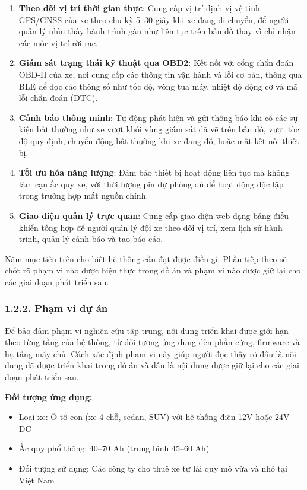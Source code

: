 \documentclass[a4paper]{extarticle}
\providecommand{\tightlist}{%
  \setlength{\itemsep}{0pt}\setlength{\parskip}{0pt}}
\begin{document}
\begin{enumerate}
\def\labelenumi{\arabic{enumi}.}
\tightlist
\item
  \textbf{Theo dõi vị trí thời gian thực}: Cung cấp vị trí định vị vệ
  tinh GPS/GNSS của xe theo chu kỳ 5--30 giây khi xe đang di chuyển, để
  người quản lý nhìn thấy hành trình gần như liên tục trên bản đồ thay
  vì chỉ nhận các mốc vị trí rời rạc.
\item
  \textbf{Giám sát trạng thái kỹ thuật qua OBD2}: Kết nối với cổng chẩn
  đoán OBD-II của xe, nơi cung cấp các thông tin vận hành và lỗi cơ bản,
  thông qua BLE để đọc các thông số như tốc độ, vòng tua máy, nhiệt độ
  động cơ và mã lỗi chẩn đoán (DTC).
\item
  \textbf{Cảnh báo thông minh}: Tự động phát hiện và gửi thông báo khi
  có các sự kiện bất thường như xe vượt khỏi vùng giám sát đã vẽ trên
  bản đồ, vượt tốc độ quy định, chuyển động bất thường khi xe đang đỗ,
  hoặc mất kết nối thiết bị.
\item
  \textbf{Tối ưu hóa năng lượng}: Đảm bảo thiết bị hoạt động liên tục mà
  không làm cạn ắc quy xe, với thời lượng pin dự phòng đủ để hoạt động
  độc lập trong trường hợp mất nguồn chính.
\item
  \textbf{Giao diện quản lý trực quan}: Cung cấp giao diện web dạng bảng
  điều khiển tổng hợp để người quản lý đội xe theo dõi vị trí, xem lịch
  sử hành trình, quản lý cảnh báo và tạo báo cáo.
\end{enumerate}

Năm mục tiêu trên cho biết hệ thống cần đạt được điều gì. Phần tiếp theo
sẽ chốt rõ phạm vi nào được hiện thực trong đồ án và phạm vi nào được
giữ lại cho các giai đoạn phát triển sau.

\subsubsection{1.2.2. Phạm vi dự
án}\label{122-phux1ea1m-vi-dux1ef1-uxe1n}

Để bảo đảm phạm vi nghiên cứu tập trung, nội dung triển khai được giới
hạn theo từng tầng của hệ thống, từ đối tượng ứng dụng đến phần cứng,
firmware và hạ tầng máy chủ. Cách xác định phạm vi này giúp người đọc
thấy rõ đâu là nội dung đã được triển khai trong đồ án và đâu là nội
dung được giữ lại cho các giai đoạn phát triển sau.

\textbf{Đối tượng ứng dụng:}

\begin{itemize}
\tightlist
\item
  Loại xe: Ô tô con (xe 4 chỗ, sedan, SUV) với hệ thống điện 12V hoặc
  24V DC
\item
  Ắc quy phổ thông: 40--70 Ah (trung bình 45--60 Ah)
\item
  Đối tượng sử dụng: Các công ty cho thuê xe tự lái quy mô vừa và nhỏ
  tại Việt Nam
\end{itemize}
\end{document}
